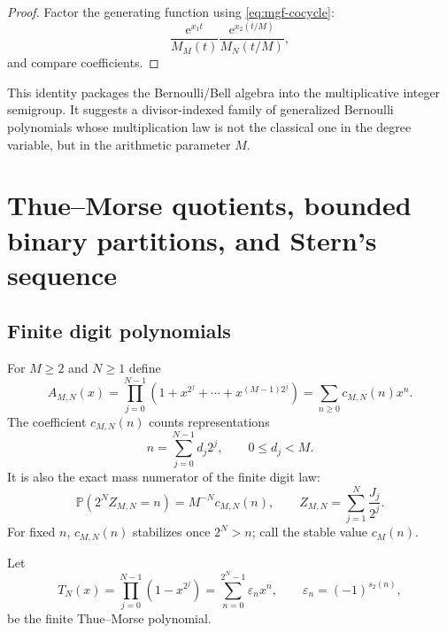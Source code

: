 \documentclass[11pt,oneside]{article}
\theoremstyle{definition}
\theoremstyle{remark}
\newcommand{\e}{\mathrm e}
\numberwithin{equation}{section}
\newcommand{\eps}{\varepsilon}
\newcommand{\1}{\mathbf 1}
\begin{document}
\begin{proof}
Factor the generating function using \eqref{eq:mgf-cocycle}:
\[
 \frac{\e^{x_1t}}{M_M(t)}
 \frac{\e^{x_2(t/M)}}{M_N(t/M)},
\]
and compare coefficients.
\end{proof}

This identity packages the Bernoulli/Bell algebra into the multiplicative integer semigroup.
It suggests a divisor-indexed family of generalized Bernoulli polynomials whose multiplication
law is not the classical one in the degree variable, but in the arithmetic parameter $M$.

\section{Thue--Morse quotients, bounded binary partitions, and Stern's sequence}
\label{sec:thue-stern}

\subsection{Finite digit polynomials}

For $M\ge2$ and $N\ge1$ define
\begin{equation}
 A_{M,N}(x)
 =\prod_{j=0}^{N-1}
 \left(1+x^{2^j}+\cdots+x^{(M-1)2^j}\right)
 =\sum_{n\ge0}c_{M,N}(n)x^n.
 \label{eq:AMN}
\end{equation}
The coefficient $c_{M,N}(n)$ counts representations
\begin{equation}
 n=\sum_{j=0}^{N-1}d_j2^j,
 \qquad 0\le d_j<M.
 \label{eq:bounded-binary-rep}
\end{equation}
It is also the exact mass numerator of the finite digit law:
\begin{equation}
 \mathbb P(2^NZ_{M,N}=n)=M^{-N}c_{M,N}(n),
 \qquad
 Z_{M,N}=\sum_{j=1}^{N}\frac{J_j}{2^j}.
 \label{eq:finite-mass}
\end{equation}
For fixed $n$, $c_{M,N}(n)$ stabilizes once $2^N>n$; call the stable value $c_M(n)$.

Let
\begin{equation}
 T_N(x)=\prod_{j=0}^{N-1}(1-x^{2^j})
 =\sum_{n=0}^{2^N-1}\eps_nx^n,
 \qquad
 \eps_n=(-1)^{s_2(n)},
 \label{eq:TN}
\end{equation}
be the finite Thue--Morse polynomial.
\end{document}
